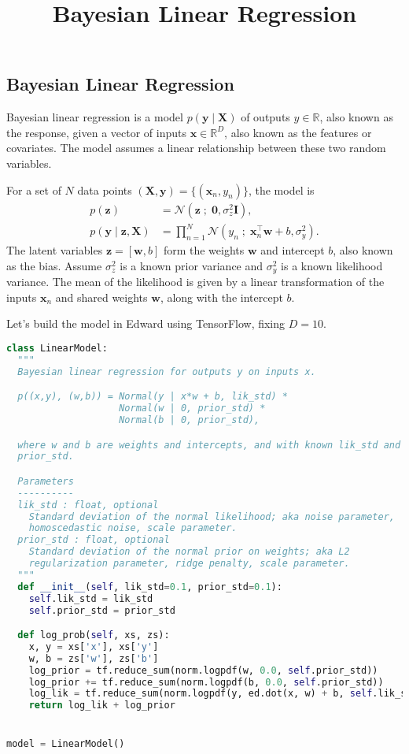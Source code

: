 \title{Bayesian Linear Regression}

\subsection{Bayesian Linear Regression}


Bayesian linear regression is a model $p(\mathbf{y}\mid \mathbf{X})$ of
outputs $y\in\mathbb{R}$, also known as the response, given
a vector of inputs
$\mathbf{x}\in\mathbb{R}^D$, also known as the features or covariates.
The model assumes a
linear relationship between these two random variables.

For a set of $N$ data points $(\mathbf{X},\mathbf{y})=\{(\mathbf{x}_n, y_n)\}$,
the model is
\begin{align*}
  p(\mathbf{z})
  &=
  \mathcal{N}(\mathbf{z} \;;\; \mathbf{0}, \sigma_z^2\mathbf{I}),
  \\
  p(\mathbf{y} \mid \mathbf{z}, \mathbf{X})
  &=
  \prod_{n=1}^N
  \mathcal{N}(y_n \;;\; \mathbf{x}_n^\top\mathbf{w} + b, \sigma_y^2).
\end{align*}
The latent variables $\mathbf{z}=[\mathbf{w},b]$ form the weights $\mathbf{w}$
and intercept $b$, also known as the bias.
Assume $\sigma_z^2$ is a known prior variance and $\sigma_y^2$ is a
known likelihood variance. The mean of the likelihood is given by a
linear transformation of the inputs $\mathbf{x}_n$ and shared weights
$\mathbf{w}$, along with the intercept $b$.

Let's build the model in Edward using TensorFlow, fixing $D=10$.
\begin{lstlisting}[language=Python]
class LinearModel:
  """
  Bayesian linear regression for outputs y on inputs x.

  p((x,y), (w,b)) = Normal(y | x*w + b, lik_std) *
                    Normal(w | 0, prior_std) *
                    Normal(b | 0, prior_std),

  where w and b are weights and intercepts, and with known lik_std and
  prior_std.

  Parameters
  ----------
  lik_std : float, optional
    Standard deviation of the normal likelihood; aka noise parameter,
    homoscedastic noise, scale parameter.
  prior_std : float, optional
    Standard deviation of the normal prior on weights; aka L2
    regularization parameter, ridge penalty, scale parameter.
  """
  def __init__(self, lik_std=0.1, prior_std=0.1):
    self.lik_std = lik_std
    self.prior_std = prior_std

  def log_prob(self, xs, zs):
    x, y = xs['x'], xs['y']
    w, b = zs['w'], zs['b']
    log_prior = tf.reduce_sum(norm.logpdf(w, 0.0, self.prior_std))
    log_prior += tf.reduce_sum(norm.logpdf(b, 0.0, self.prior_std))
    log_lik = tf.reduce_sum(norm.logpdf(y, ed.dot(x, w) + b, self.lik_std))
    return log_lik + log_prior


model = LinearModel()
\end{lstlisting}


